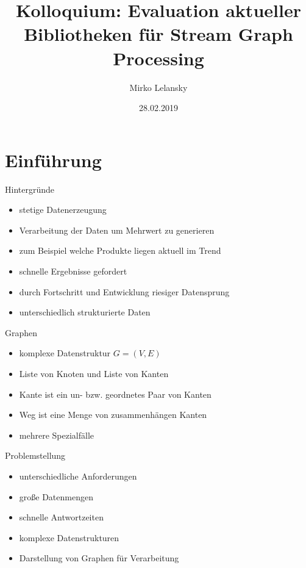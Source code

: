 \documentclass[a4paper, fontsize=11pt]{beamer}
\begin{document}
\begin{frame}
\author{Mirko Lelansky}
\title{Kolloquium: Evaluation aktueller Bibliotheken für Stream Graph Processing}
\date{28.02.2019}
\maketitle
\end{frame}

\begin{frame}
\tableofcontents
\end{frame}

\section{Einführung}
\begin{frame}{Hintergründe}
\begin{itemize}
\item stetige Datenerzeugung
\item Verarbeitung der Daten um Mehrwert zu generieren
\item zum Beispiel welche Produkte liegen aktuell im Trend
\item schnelle Ergebnisse gefordert
\item durch Fortschritt und Entwicklung riesiger Datensprung
\item unterschiedlich strukturierte Daten
\end{itemize}
\end{frame}

\begin{frame}{Graphen}
\begin{itemize}
\item komplexe Datenstruktur $ G = (V,E)$
\item Liste von Knoten und Liste von Kanten
\item Kante ist ein un- bzw. geordnetes Paar von Kanten
\item Weg ist eine Menge von zusammenhängen Kanten
\item mehrere Spezialfälle
\end{itemize}
\end{frame}

\begin{frame}{Problemstellung}
\begin{itemize}
\item unterschiedliche Anforderungen
\item große Datenmengen
\item schnelle Antwortzeiten
\item komplexe Datenstrukturen
\item Darstellung von Graphen für Verarbeitung
\end{itemize}
\end{frame}
\end{document}
